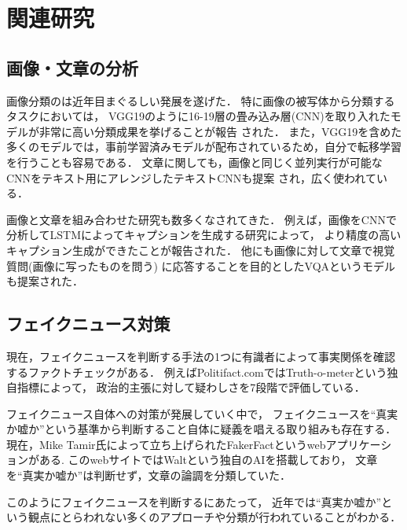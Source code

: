 \section{関連研究}
\label{ch:related}

\subsection{画像・文章の分析}
画像分類のは近年目まぐるしい発展を遂げた．
特に画像の被写体から分類するタスクにおいては，
VGG19のように16-19層の畳み込み層(CNN)を取り入れたモデルが非常に高い分類成果を挙げることが報告
\cite{DBLP:journals/corr/SimonyanZ14a}された．
また，VGG19を含めた多くのモデルでは，事前学習済みモデルが配布されているため，自分で転移学習を行うことも容易である．
文章に関しても，画像と同じく並列実行が可能なCNNをテキスト用にアレンジしたテキストCNNも提案
\cite{DBLP:journals/corr/Kim14f}され，広く使われている．

画像と文章を組み合わせた研究も数多くなされてきた．
例えば，画像をCNNで分析してLSTMによってキャプションを生成する研究\cite{7298935}によって，
より精度の高いキャプション生成ができたことが報告された．
他にも画像に対して文章で視覚質問(画像に写ったものを問う)
に応答することを目的としたVQA\cite{7410636}というモデルも提案された．

\subsection{フェイクニュース対策}
現在，フェイクニュースを判断する手法の1つに有識者によって事実関係を確認するファクトチェックがある．
例えばPolitifact.comではTruth-o-meterという独自指標によって，
政治的主張に対して疑わしさを7段階で評価\cite{holan_2018}している．

フェイクニュース自体への対策が発展していく中で，
フェイクニュースを``真実か嘘か''という基準から判断すること自体に疑義を唱える取り組みも存在する．
現在，Mike Tamir氏によって立ち上げられたFakerFactというwebアプリケーションがある\cite{tamir}.
このwebサイトではWaltという独自のAIを搭載しており，
文章を``真実か嘘か''は判断せず，文章の論調を分類していた．

このようにフェイクニュースを判断するにあたって，
近年では``真実か嘘か''という観点にとらわれない多くのアプローチや分類が行われていることがわかる．
